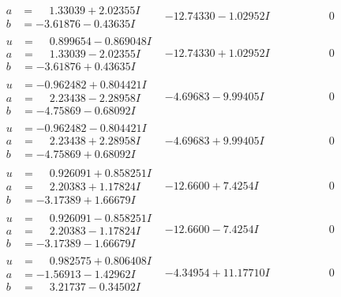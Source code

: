 \documentclass[1p]{elsarticle_modified}
\theoremstyle{definition}
\begin{document}
$$\begin{array}{c|c|c}
\begin{aligned}
a &= \phantom{-}1.33039 + 2.02355 I \\
b &= -3.61876 - 0.43635 I\end{aligned}
 & -12.74330 - 1.02952 I & \phantom{-0.000000 } 0 \\ \hline\begin{aligned}
u &= \phantom{-}0.899654 - 0.869048 I \\
a &= \phantom{-}1.33039 - 2.02355 I \\
b &= -3.61876 + 0.43635 I\end{aligned}
 & -12.74330 + 1.02952 I & \phantom{-0.000000 } 0 \\ \hline\begin{aligned}
u &= -0.962482 + 0.804421 I \\
a &= \phantom{-}2.23438 - 2.28958 I \\
b &= -4.75869 - 0.68092 I\end{aligned}
 & -4.69683 - 9.99405 I & \phantom{-0.000000 } 0 \\ \hline\begin{aligned}
u &= -0.962482 - 0.804421 I \\
a &= \phantom{-}2.23438 + 2.28958 I \\
b &= -4.75869 + 0.68092 I\end{aligned}
 & -4.69683 + 9.99405 I & \phantom{-0.000000 } 0 \\ \hline\begin{aligned}
u &= \phantom{-}0.926091 + 0.858251 I \\
a &= \phantom{-}2.20383 + 1.17824 I \\
b &= -3.17389 + 1.66679 I\end{aligned}
 & -12.6600 + 7.4254 I & \phantom{-0.000000 } 0 \\ \hline\begin{aligned}
u &= \phantom{-}0.926091 - 0.858251 I \\
a &= \phantom{-}2.20383 - 1.17824 I \\
b &= -3.17389 - 1.66679 I\end{aligned}
 & -12.6600 - 7.4254 I & \phantom{-0.000000 } 0 \\ \hline\begin{aligned}
u &= \phantom{-}0.982575 + 0.806408 I \\
a &= -1.56913 - 1.42962 I \\
b &= \phantom{-}3.21737 - 0.34502 I\end{aligned}
 & -4.34954 + 11.17710 I & \phantom{-0.000000 } 0 \\ \hline\begin{aligned}

\end{aligned}
\end{array}$$
\end{document}
